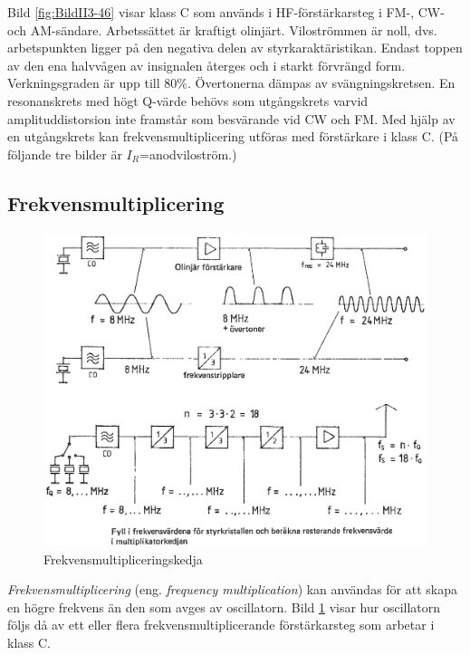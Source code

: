 Bild \ref{fig:BildII3-46} visar klass C som används i HF-förstärkarsteg i
FM-, CW- och AM-sändare.
Arbetssättet är kraftigt olinjärt.
Viloströmmen är noll, dvs. arbetspunkten ligger på den negativa delen av
styrkaraktäristikan.
Endast toppen av den ena halvvågen av insignalen återges och i starkt
förvrängd form.
Verkningsgraden är upp till 80\%.
Övertonerna dämpas av svängningskretsen.
En resonanskrets med högt Q-värde behövs som utgångskrets varvid
amplituddistorsion inte framstår som besvärande vid CW och FM.
Med hjälp av en utgångskrets kan frekvensmultiplicering utföras med
förstärkare i klass C.
(På följande tre bilder är \(I_R\)=anodviloström.)

\subsection{Frekvensmultiplicering}

\begin{figure}
\includegraphics[width=\textwidth]{images/cropped_pdfs/bild_2_3-47.pdf}
\caption{Frekvensmultipliceringskedja}
\label{fig:BildII3-47}
\end{figure}

\emph{Frekvensmultiplicering} (eng. \emph{frequency multiplication}) kan
användas för att skapa en högre frekvens än den som avges av oscillatorn.
Bild \ref{fig:BildII3-47} visar hur oscillatorn följs då av ett eller flera
frekvensmultiplicerande förstärkarsteg som arbetar i klass C.

